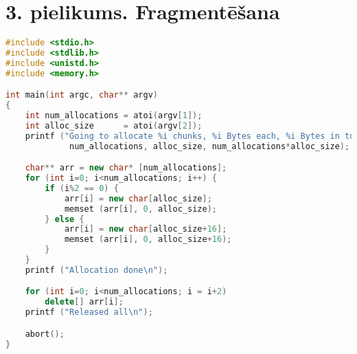 \newpage
\chapter{3. pielikums. Fragmentēšana}

\begin{lstlisting}[language=C++]
#include <stdio.h>
#include <stdlib.h>
#include <unistd.h>
#include <memory.h>

int main(int argc, char** argv)
{
	int num_allocations = atoi(argv[1]);
	int alloc_size      = atoi(argv[2]);
	printf ("Going to allocate %i chunks, %i Bytes each, %i Bytes in total\n",
	         num_allocations, alloc_size, num_allocations*alloc_size);

	char** arr = new char* [num_allocations];
	for (int i=0; i<num_allocations; i++) {
		if (i%2 == 0) {
			arr[i] = new char[alloc_size];
			memset (arr[i], 0, alloc_size);
		} else {
			arr[i] = new char[alloc_size+16];
			memset (arr[i], 0, alloc_size+16);
		}
	}
	printf ("Allocation done\n");

	for (int i=0; i<num_allocations; i = i+2)
		delete[] arr[i];
	printf ("Released all\n");

	abort();
} 
\end{lstlisting}

